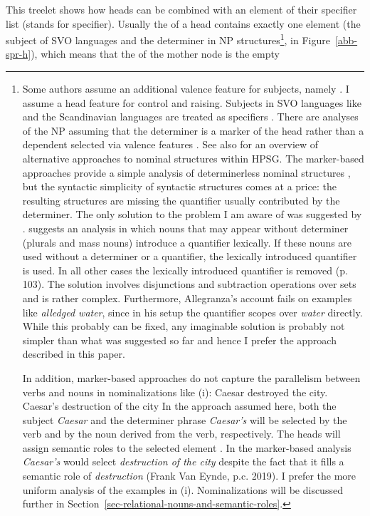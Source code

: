\documentclass[output=paper
  ,nobabel
  ,draftmode
  ,uniformtopskip %
  ,colorlinks, citecolor=brown
]{langscibook}
\begin{document}
This treelet shows how heads can be combined with an element of their specifier list (\spr stands
for specifier). Usually the \sprl of a head contains exactly one element (the subject of SVO
languages and the determiner in NP structures\footnote{%
  Some authors assume an additional valence feature for subjects, namely \subj \parencites{Borsley87a}[Chapter~9]{ps2}. I assume a head feature
  \subj for control and raising. Subjects in SVO languages like  and the Scandinavian
  languages are treated as specifiers \citep{MuellerGermanic}. There are analyses of the NP assuming
  that the determiner is a marker of the head rather than a dependent selected via valence features
  \citep{VanEynde2006b,Allegranza2007a-u,Sag2012a}. See also  for an
  overview of alternative approaches to nominal structures within HPSG. 
  The marker-based approaches provide a simple analysis of determinerless nominal structures
  \citep[, 174--175]{VanEynde2006b}, but the syntactic simplicity of syntactic structures
  comes at a price: the resulting structures are missing the quantifier usually contributed by the
  determiner. The only solution to the problem I am aware of was suggested by
  \citet{Allegranza98a-u}. \citet{Allegranza98a-u} suggests an analysis in which nouns that may appear
  without determiner (plurals and mass nouns) introduce a quantifier lexically. If these nouns are
  used without a determiner or a quantifier, the lexically introduced quantifier is used. In all
  other cases the lexically introduced quantifier is removed (p.\,103). The solution involves
  disjunctions and subtraction operations over sets and is rather complex. Furthermore, Allegranza's account fails
  on examples like \emph{alledged water}, since in his setup the quantifier scopes over \emph{water}
  directly. While this probably can be fixed, any imaginable solution is probably not simpler than
  what was suggested so far and hence I prefer the approach described in this paper.

In addition, marker-based approaches do not capture the parallelism between verbs and nouns in nominalizations like (i):
\eal
\ex Caesar destroyed the city.
\ex Caesar's destruction of the city
\zl
In the approach assumed here, both the subject \emph{Caesar} and the determiner phrase \emph{Caesar's} will be selected by the
verb and by the noun derived from the verb, respectively. The heads will assign semantic roles to
the selected element \citep{MyPM2021a}. In the marker-based analysis
\emph{Caesar's} would select \emph{destruction of the city} despite the fact that it fills a
semantic role of \emph{destruction} (Frank Van Eynde, p.c. 2019). I prefer the more uniform analysis of
the examples in (i). Nominalizations will be discussed further in Section~\ref{sec-relational-nouns-and-semantic-roles}.
},  in Figure~\ref{abb-spr-h}), which means that the \sprl of the mother node is the empty
\end{document}

